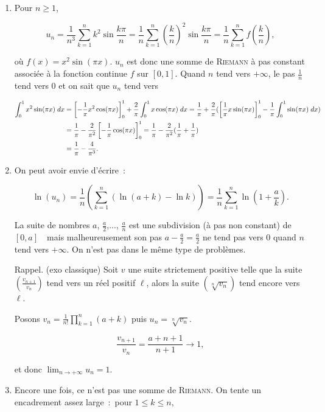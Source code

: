 \documentclass[11pt,a4paper]{article}
\newcounter{exo}
\begin{document}
\begin{enumerate}
\item  Pour $n\geq1$, 

$$u_n=\frac{1}{n^3}\sum_{k=1}^{n}k^2\sin\frac{k\pi}{n}=\frac{1}{n}\sum_{k=1}^{n}(\frac{k}{n})^2\sin\frac{k\pi}{n}
=\frac{1}{n}\sum_{k=1}^{n}f(\frac{k}{n}),$$

où $f(x)=x^2\sin(\pi x)$. $u_n$ est donc une somme de \textsc{Riemann} à pas constant associée à la fonction continue $f$ sur $[0,1]$. Quand $n$ tend vers $+\infty$, le pas $\frac{1}{n}$ tend vers $0$ et on sait que $u_n$ tend vers
 
\begin{align*}\ensuremath
\int_{0}^{1}x^2\sin(\pi x)\;dx&=\left[-\frac{1}{\pi}x^2\cos(\pi x)\right]_{0}^{1}+\frac{2}{\pi}\int_{0}^{1}x\cos(\pi x)\;dx
=\frac{1}{\pi}+\frac{2}{\pi}(\left[\frac{1}{\pi}x\sin(\pi x)\right]_{0}^{1}-\frac{1}{\pi}\int_{0}^{1}\sin(\pi x)\;dx)\\
  &=\frac{1}{\pi}-\frac{2}{\pi^2}\left[-\frac{1}{\pi}\cos(\pi x)\right]_{0}^{1}=\frac{1}{\pi}-\frac{2}{\pi^2}(\frac{1}{\pi}+\frac{1}{\pi})\\
  &=\frac{1}{\pi}-\frac{4}{\pi^3}.
\end{align*}

\item  On peut avoir envie d'écrire~:~

$$\ln(u_n)=\frac{1}{n}(\sum_{k=1}^{n}(\ln(a+k)-\ln k))=\frac{1}{n}\sum_{k=1}^{n}\ln(1+\frac{a}{k}).$$

La suite de nombres $a$, $\frac{a}{2}$,..., $\frac{a}{n}$ \og est une subdivision (à pas non constant) de $[0,a]$~\fg~mais malheureusement son pas $a-\frac{a}{2}=\frac{a}{2}$ ne tend pas vers $0$ quand $n$ tend vers $+\infty$. On n'est pas dans le même type de problèmes.

Rappel. (exo classique) Soit $v$ une suite strictement positive telle que la suite $(\frac{v_{n+1}}{v_n})$ tend vers un réel positif $\ell$, alors la suite $(\sqrt[n]{v_n})$ tend encore vers $\ell$.

Posons $v_n=\frac{1}{n!}\prod_{k=1}^{n}(a+k)$ puis $u_n=\sqrt[n]{v_n}$.

$$\frac{v_{n+1}}{v_n}=\frac{a+n+1}{n+1}\rightarrow1,$$

et donc $\lim_{n\rightarrow +\infty}u_n=1$.

\item  Encore une fois, ce n'est pas une somme de \textsc{Riemann}. On tente un encadrement assez large~:~pour $1\leq k\leq n$, 


\end{enumerate}
\end{document}
